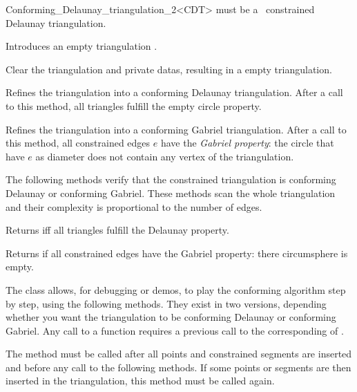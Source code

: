 \begin{ccRefClass}{Conforming_Delaunay_triangulation_2<CDT>}
 must be a \cgal\ constrained Delaunay triangulation.

\ccTypes 
{}

\ccCreation
{}

{Introduces an empty triangulation \ccVar.}

\ccOperations

{ Clear the triangulation and private datas, resulting in a empty
  triangulation. }


{ Refines the triangulation into a conforming Delaunay triangulation.
  After a call to this method, all triangles fulfill the empty circle
  property. }

{ Refines the triangulation into a conforming Gabriel triangulation.
  After a call to this method, all constrained edges $e$ have the
  \emph{Gabriel property}: the circle that have $e$ as diameter
  does not contain any vertex of the triangulation. }

The following methods verify that the constrained triangulation is
conforming Delaunay or conforming Gabriel. These methods scan the
whole triangulation and their complexity is proportional to the number
of edges.

{ Returns  iff all triangles fulfill the Delaunay property.}

{ Returns  if all constrained edges have the Gabriel property:
  there circumsphere is empty. }

\begin{ccAdvanced}


The \ccRefName{} class allows, for debugging or demos, to play the
conforming algorithm step by step, using the following methods. They
exist in two versions, depending whether you want the triangulation to
be conforming Delaunay or conforming Gabriel. Any call to a
 function requires a previous call to
the corresponding of .

{ The method must be called after all points and constrained segments
  are inserted and before any call to the following methods. If some
  points or segments are then inserted in the triangulation, this
  method must be called again. }


\end{ccAdvanced}
\end{ccRefClass}
